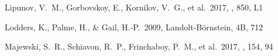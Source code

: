 \documentclass[twocolumn,twocolappendix]{aastex63}
\begin{document}
{\begin{thebibliography}{}






 Lipunov, V.~M., Gorbovskoy, E., Kornilov, V.~G., et al.\ 2017, \apjl, 850, L1


 Lodders, K., Palme, H., \& Gail, H.-P.\ 2009, Landolt-B\"ornstein, 4B, 712

















 Majewski, S.~R., Schiavon, R.~P., Frinchaboy, P.~M., et al.\ 2017, \aj, 154, 94







\end{thebibliography}}
\end{document}
